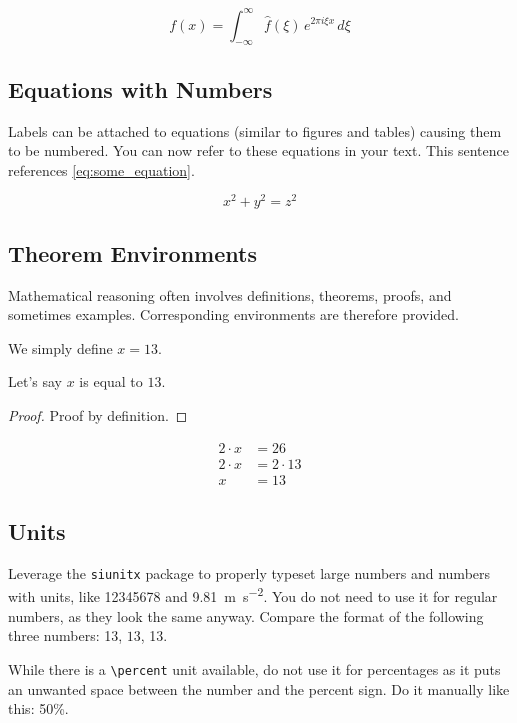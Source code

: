$$f(x) = \int_{-\infty}^\infty \hat f(\xi)\,e^{2 \pi i \xi x} \,d\xi$$

\subsection{Equations with Numbers}

Labels can be attached to equations (similar to figures and tables) causing them to be numbered.
You can now refer to these equations in your text.
This sentence references \cref{eq:some_equation}.

\begin{equation}
	x^2 + y^2 = z^2
	\label{eq:some_equation}
\end{equation}

\subsection{Theorem Environments}

Mathematical reasoning often involves definitions, theorems, proofs, and sometimes examples.
Corresponding environments are therefore provided.

\begin{definition}
	We simply define $x = 13$.
\end{definition}

\begin{theorem}
	Let's say $x$ is equal to $13$.
\end{theorem}

\begin{proof}
	Proof by definition.
\end{proof}

\begin{example}
	\begin{align*}
		2 \cdot x &= 26\\
		2 \cdot x &= 2 \cdot 13\\
		x &= 13
	\end{align*}
\end{example}

\subsection{Units}

Leverage the \texttt{siunitx} package to properly typeset large numbers and numbers with units, like \num{12345678} and \SI{9.81}{\meter\per\second^2}.
You do not need to use it for regular numbers, as they look the same anyway.
Compare the format of the following three numbers: 13, $13$, \num{13}.

While there is a \texttt{\textbackslash{}percent} unit available, do not use it for percentages as it puts an unwanted space between the number and the percent sign.
Do it manually like this: 50\%.
